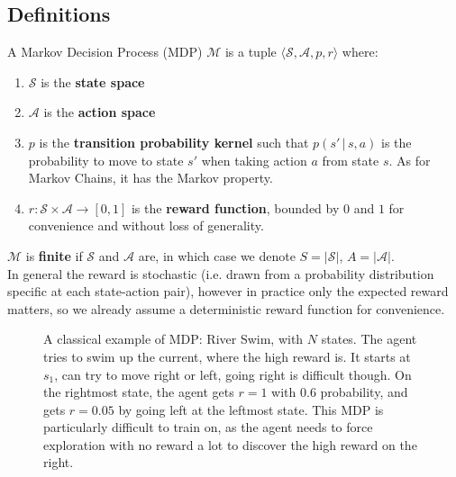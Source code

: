 \subsection{Definitions}
\label{subsec:MDP-defs}

\begin{defi}
  A Markov Decision Process (MDP) $\mathcal{M}$ is a tuple $\langle \mathcal{S}, \mathcal{A}, p, r \rangle$ where:
  \begin{enumerate}
  \item $\mathcal{S}$ is the \textbf{state space}
  \item $\mathcal{A}$ is the \textbf{action space}
  \item $p $ is the \textbf{transition probability kernel} such that $p(s' \,|\, s, a)$ is the probability to move to state $s'$ when taking action $a$ from state $s$. As for Markov Chains, it has the Markov property.
  \item $r: \mathcal{S} \times \mathcal{A} \to [0,1]$ is the \textbf{reward function}, bounded by $0$ and $1$ for convenience and without loss of generality.
  \end{enumerate}
  $\mathcal{M}$ is \textbf{finite} if $\mathcal{S}$ and $\mathcal{A}$ are, in which case we denote $S = |\mathcal{S}|$, $A = |\mathcal{A}|$.\\
  In general the reward is stochastic (i.e. drawn from a probability distribution specific at each state-action pair), however in practice only the expected reward matters, so we already assume a deterministic reward function for convenience.
\end{defi}

\begin{figure}[htb]
  \centering
  \def\svgwidth{340pt}
  
  \caption{A classical example of MDP: River Swim, with $N$ states. The agent tries to swim up the current, where the high reward is. It starts at $s_1$, can try to move right or left, going right is difficult though. On the rightmost state, the agent gets $r=1$ with $0.6$ probability, and gets $r=0.05$ by going left at the leftmost state. This MDP is particularly difficult to train on, as the agent needs to force exploration with no reward a lot to discover the high reward on the right.}
  \label{fig:river}
\end{figure}

